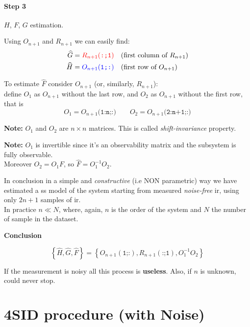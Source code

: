 \paragraph{Step 3} \label{step3} $H$, $F$, $G$ estimation.

Using $O_{n+1}$ and $R_{n+1}$ we can easily find:
\begin{align*}
    \hat{G} =  \color{red} R_{n+1}(\texttt{:;1}) & \quad\text{(first column of $R_{n+1}$)} \\
    \hat{H} =  \color{blue} O_{n+1}(\texttt{1;:}) & \quad\text{(first row of $O_{n+1}$)} \\
\end{align*}

To estimate $\hat{F}$ consider $O_{n+1}$ (or, similarly, $R_{n+1}$):\\
define $O_1$ as $O_{n+1}$ without the last row, and $O_2$ as $O_{n+1}$ without the first row, that is
\[O_1 = O_{n+1}\texttt{(1:n;:)} \qquad O_2 = O_{n+1}\texttt{(2:n+1;:)}\]

\textbf{Note:} $O_1$ and $O_2$ are $n\times n$ matrices.
This is called \emph{shift-invariance} property.

\textbf{Note:} $O_1$ is invertible since it's an observability matrix and the subsystem is fully observable.\\

Moreover $O_2 = O_1 F$, so $\hat{F} = O_1^{-1}O_2$.

In conclusion in a simple and \emph{constructive} (i.e NON parametric) way we have estimated a \acrlong{ss} model of the system starting from measured \emph{noise-free} \gls{ir}, using only $2n+1$ samples of \gls{ir}. \\
In practice $n \ll N$, where, again, $n$ is the order of the system and $N$ the number of sample in the dataset.

\textbf{Conclusion}

\[ \left\{\hat{H}, \hat{G}, \hat{F}\right\} = \left\{O_{n+1}(\texttt{1;:}), R_{n+1}(\texttt{:;1}), O_1^{-1}O_2\right\}\]

\begin{remark}
    If the measurement is noisy all this process is \textbf{useless}. Also, if $n$ is unknown,  could never stop.
\end{remark}

\section{4SID procedure (with Noise)} \label{4sid-noise}

